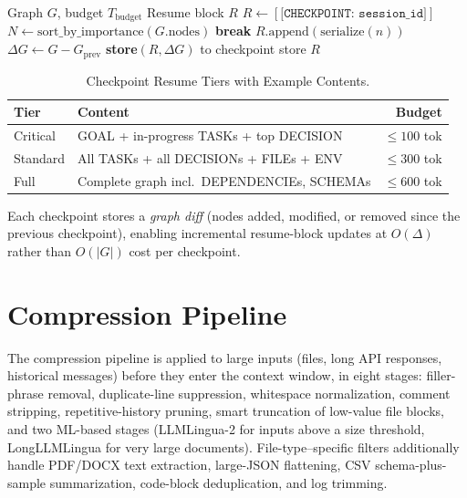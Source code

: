 \documentclass[journal]{IEEEtran}
\begin{document}
\begin{algorithm}[t]
\caption{Checkpoint Serialization}
\label{alg:checkpoint}
\begin{algorithmic}[1]
\REQUIRE Graph $G$, budget $T_\mathrm{budget}$
\ENSURE Resume block $R$
\STATE $R \leftarrow [\texttt{[CHECKPOINT: session\_id]}]$
\STATE $N \leftarrow \mathrm{sort\_by\_importance}(G.\mathrm{nodes})$
    \STATE \textbf{break}
  \ENDIF
  \STATE $R.\mathrm{append}(\mathrm{serialize}(n))$
\ENDFOR
\STATE $\Delta G \leftarrow G - G_\mathrm{prev}$
\STATE \textbf{store}$(R, \Delta G)$ to checkpoint store
\RETURN $R$
\end{algorithmic}
\end{algorithm}

\begin{table}[t]
  \centering
  \caption{Checkpoint Resume Tiers with Example Contents.}
  \label{tab:tiers}
  \renewcommand{\arraystretch}{1.2}
  \begin{tabular}{@{}p{1.3cm}p{4.8cm}r@{}}
    \toprule
    \textbf{Tier} & \textbf{Content} & \textbf{Budget} \\
    \midrule
    Critical & GOAL + in-progress TASKs + top DECISION
              & $\leq 100$ tok \\
    Standard & All TASKs + all DECISIONs + FILEs + ENV
              & $\leq 300$ tok \\
    Full     & Complete graph incl.\ DEPENDENCIEs, SCHEMAs
              & $\leq 600$ tok \\
    \bottomrule
  \end{tabular}
\end{table}

Each checkpoint stores a \emph{graph diff} (nodes added,
modified, or removed since the previous checkpoint), enabling
incremental resume-block updates at $O(\Delta)$ rather than
$O(|G|)$ cost per checkpoint.

\section{Compression Pipeline}
\label{sec:compression}

The compression pipeline is applied to large inputs (files,
long API responses, historical messages) before they enter the
context window, in eight stages: filler-phrase removal,
duplicate-line suppression, whitespace normalization, comment
stripping, repetitive-history pruning, smart truncation of
low-value file blocks, and two ML-based stages (LLMLingua-2 for
inputs above a size threshold, LongLLMLingua for very large
documents).
File-type--specific filters additionally handle PDF/DOCX text
extraction, large-JSON flattening, CSV schema-plus-sample
summarization, code-block deduplication, and log trimming.
\end{document}
